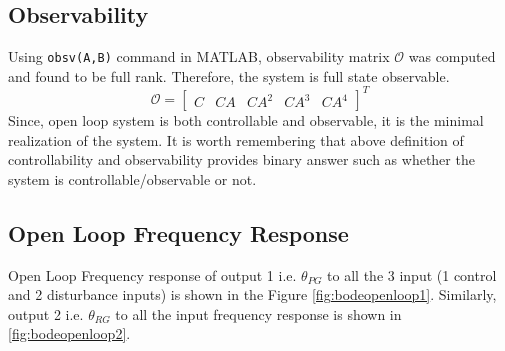 \documentclass[12pt]{article}
\begin{document}
	\subsection{Observability}
	Using \texttt{obsv(A,B)} command in MATLAB, observability matrix $\mathcal{O}$ was computed and found to be full rank. Therefore, the system is full state observable.  
	\begin{equation}
	\mathcal{O}= \begin{bmatrix}
	C & CA & CA^2 & CA^3 & CA^4
	\end{bmatrix}^{T}
	\end{equation}
	Since, open loop system is both controllable and observable, it is the minimal realization of the system. It is worth remembering that above definition of controllability and observability provides binary answer such as whether the system is controllable/observable or not. 
	
	\subsection{Open Loop Frequency Response}
	Open Loop Frequency response of output 1 i.e. $\theta_{PG}$ to all the 3 input (1 control and 2 disturbance inputs) is shown in the Figure \ref{fig:bodeopenloop1}. Similarly, output 2 i.e. $\theta_{RG}$ to all the input frequency response is shown in \ref{fig:bodeopenloop2}.
	
\end{document}
